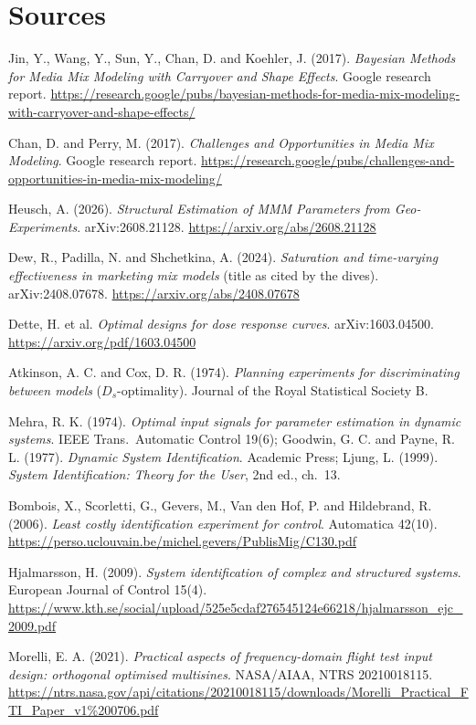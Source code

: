 \section*{Sources}
\begingroup\raggedright
\begin{enumerate}[label={[\arabic*]},leftmargin=2.5em]
\item Jin, Y., Wang, Y., Sun, Y., Chan, D. and Koehler, J. (2017). \emph{Bayesian Methods for Media Mix Modeling with Carryover and Shape Effects}. Google research report. \url{https://research.google/pubs/bayesian-methods-for-media-mix-modeling-with-carryover-and-shape-effects/}
\item Chan, D. and Perry, M. (2017). \emph{Challenges and Opportunities in Media Mix Modeling}. Google research report. \url{https://research.google/pubs/challenges-and-opportunities-in-media-mix-modeling/}
\item Heusch, A. (2026). \emph{Structural Estimation of MMM Parameters from Geo-Experiments}. arXiv:2608.21128. \url{https://arxiv.org/abs/2608.21128}
\item Dew, R., Padilla, N. and Shchetkina, A. (2024). \emph{Saturation and time-varying effectiveness in marketing mix models} (title as cited by the dives). arXiv:2408.07678. \url{https://arxiv.org/abs/2408.07678}
\item Dette, H. et al. \emph{Optimal designs for dose response curves}. arXiv:1603.04500. \url{https://arxiv.org/pdf/1603.04500}
\item Atkinson, A. C. and Cox, D. R. (1974). \emph{Planning experiments for discriminating between models} ($D_s$-optimality). Journal of the Royal Statistical Society B.
\item Mehra, R. K. (1974). \emph{Optimal input signals for parameter estimation in dynamic systems}. IEEE Trans.\ Automatic Control 19(6); Goodwin, G. C. and Payne, R. L. (1977). \emph{Dynamic System Identification}. Academic Press; Ljung, L. (1999). \emph{System Identification: Theory for the User}, 2nd ed., ch.\ 13.
\item Bombois, X., Scorletti, G., Gevers, M., Van den Hof, P. and Hildebrand, R. (2006). \emph{Least costly identification experiment for control}. Automatica 42(10). \url{https://perso.uclouvain.be/michel.gevers/PublisMig/C130.pdf}
\item Hjalmarsson, H. (2009). \emph{System identification of complex and structured systems}. European Journal of Control 15(4). \url{https://www.kth.se/social/upload/525e5cdaf276545124e66218/hjalmarsson_ejc_2009.pdf}
\item Morelli, E. A. (2021). \emph{Practical aspects of frequency-domain flight test input design: orthogonal optimised multisines}. NASA/AIAA, NTRS 20210018115. \url{https://ntrs.nasa.gov/api/citations/20210018115/downloads/Morelli_Practical_FTI_Paper_v1%200706.pdf}

\end{enumerate}
